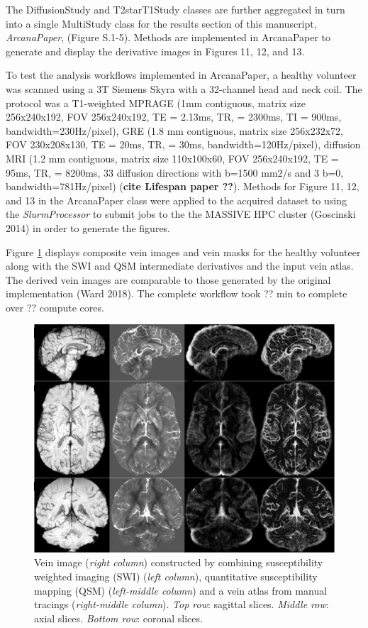 The DiffusionStudy and T2starT1Study classes are further aggregated in
turn into a single MultiStudy class for the results section of this
manuscript\emph{, ArcanaPaper}, (Figure S.1-5). Methods are implemented
in ArcanaPaper to generate and display the derivative images in Figures
11, 12, and 13.

To test the analysis workflows implemented in ArcanaPaper, a healthy
volunteer was scanned using a 3T Siemens Skyra with a 32-channel head
and neck coil. The protocol was a T1-weighted MPRAGE (1mm contiguous,
matrix size 256x240x192, FOV 256x240x192, TE = 2.13ms, TR, = 2300ms, TI
= 900ms, bandwidth=230Hz/pixel), GRE (1.8 mm contiguous, matrix size
256x232x72, FOV 230x208x130, TE = 20ms, TR, = 30ms,
bandwidth=120Hz/pixel), diffusion MRI (1.2 mm contiguous, matrix size
110x100x60, FOV 256x240x192, TE = 95ms, TR, = 8200ms, 33 diffusion
directions with b=1500 mm2/s and 3 b=0, bandwidth=781Hz/pixel)
(\textbf{cite Lifespan paper ??}). Methods for Figure 11, 12, and 13 in
the ArcanaPaper class were applied to the acquired dataset to using the
\emph{SlurmProcessor} to submit jobs to the the MASSIVE HPC cluster
(Goscinski 2014) in order to generate the figures.

Figure \ref{fig:veins} displays composite vein images and vein masks for the healthy
volunteer along with the SWI and QSM intermediate derivatives and the
input vein atlas. The derived vein images are comparable to those
generated by the original implementation (Ward 2018). The complete
workflow took ?? min to complete over ?? compute cores.


\begin{figure}
  \begin{center}
    \includegraphics[width=\textwidth]{figures/veins}
  \caption{Vein image (\emph{right column}) constructed by
combining susceptibility weighted imaging (SWI) (\emph{left column}),
quantitative susceptibility mapping (QSM) (\emph{left-middle column})
and a vein atlas from manual tracings (\emph{right-middle column}).
\emph{Top row}: sagittal slices. \emph{Middle row}: axial slices.
\emph{Bottom row}: coronal slices.}
  \end{center}
\label{fig:veins}
\end{figure}

